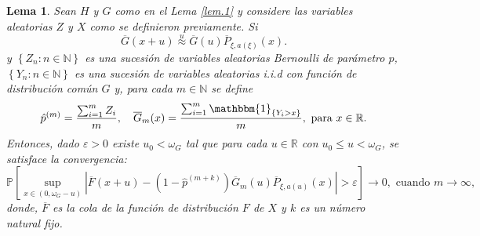 \documentclass[10.5pt,notitlepage]{article}
\newcommand{\PP}{\mathbb{P}}
\newcommand{\RR}{\mathbb{R}}
\newcommand{\ee}{\varepsilon}
\newcommand{\NN}{\mathbb{N}}
\newcommand{\approxu}{\overset{u}{\approx}}
\newcommand{\abs}[1]{\left\lvert #1 \right\rvert}
\newcommand{\corch}[1]{\left[ #1 \right]}
\newcommand{\kis}[1]{\left\{ #1 \right\}}
\theoremstyle{plain}
\newtheorem{lem}[thm]{Lema} %
\begin{document}
\begin{lem}\label{lem.2}
Sean \(H\) y \(G\) como en el Lema \ref{lem.1} y considere las variables aleatorias \(Z\) y \(X\) como se definieron previamente. Si 
\begin{equation}\label{asin.2}
    \overline{G}(x + u) \approxu \overline{G}(u)\overline{P}_{\xi,a(\xi)}(x).
\end{equation}
y \(\kis{Z_n : n \in \NN}\) es una sucesión de variables aleatorias Bernoulli de parámetro \(p\), \(\kis{Y_n : n \in \NN}\) es una sucesión de variables aleatorias i.i.d con función de distribución común \(G\) y, para cada \(m \in \NN\) se define 
\begin{equation*}
    \hat{p}^{(m)} = \frac{\sum_{i = 1}^{m }Z_{i}}{m}, \quad \overline{G}_{m}(x) = \frac{\sum_{i = 1}^{m}\mathbbm{1}_{\kis{Y_{i} > x}}}{m}, \text{ para } x \in \RR.
\end{equation*}
Entonces, dado \(\ee > 0\) existe \(u_0< \omega_G\) tal que para cada \(u\in \RR\) con \(u_0 \leq u < \omega_G\), se satisface la convergencia:
 \[
\PP\corch{ \sup_{x \in (0, \omega_{G}- u)}\abs{\overline{F}(x + u) -  (1 - \hat{p}^{(m + k)})\overline{G}_{m}(u)\overline{P}_{\xi,a(u)}(x)} > \ee}\to 0, \text{ cuando } m \to \infty,
\]
donde, \(\overline{F}\) es la cola de la función de distribución \(F\) de \(X\) y \(k\) es un número natural fijo. 
\end{lem}
\end{document}
